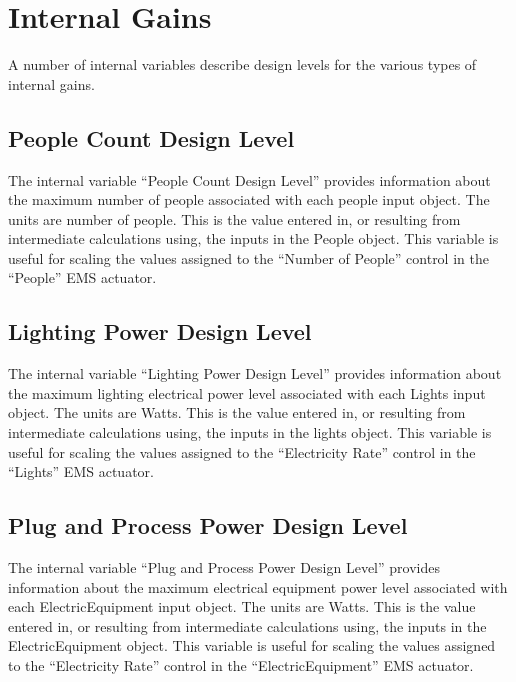 \section{Internal Gains}\label{internal-gains}

A number of internal variables describe design levels for the various types of internal gains.

\subsection{People Count Design Level}\label{people-count-design-level}

The internal variable ``People Count Design Level'' provides information about the maximum number of people associated with each people input object. The units are number of people. This is the value entered in, or resulting from intermediate calculations using, the inputs in the People object. This variable is useful for scaling the values assigned to the ``Number of People'' control in the ``People'' EMS actuator.

\subsection{Lighting Power Design Level}\label{lighting-power-design-level}

The internal variable ``Lighting Power Design Level'' provides information about the maximum lighting electrical power level associated with each Lights input object. The units are Watts. This is the value entered in, or resulting from intermediate calculations using, the inputs in the lights object. This variable is useful for scaling the values assigned to the ``Electricity Rate'' control in the ``Lights'' EMS actuator.

\subsection{Plug and Process Power Design Level}\label{plug-and-process-power-design-level}

The internal variable ``Plug and Process Power Design Level'' provides information about the maximum electrical equipment power level associated with each ElectricEquipment input object. The units are Watts. This is the value entered in, or resulting from intermediate calculations using, the inputs in the ElectricEquipment object. This variable is useful for scaling the values assigned to the ``Electricity Rate'' control in the ``ElectricEquipment'' EMS actuator.

